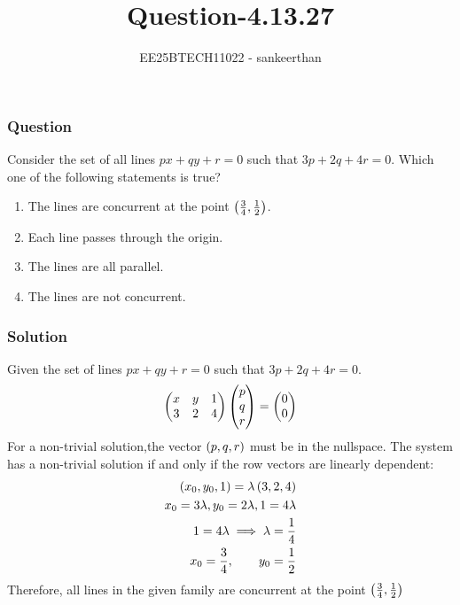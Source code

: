 \documentclass{beamer}
\title{Question-4.13.27}
\author{EE25BTECH11022 - sankeerthan}
\date{}
\begin{document}
\frame{\titlepage}

\begin{frame}
\frametitle{Question}
Consider the set of all lines $px + qy + r = 0$ such that $3p + 2q + 4r = 0$.
Which one of the following statements is true?
\begin{enumerate}
  \item The lines are concurrent at the point $\left(\frac{3}{4},\frac{1}{2}\right)$.
  \item Each line passes through the origin.
  \item The lines are all parallel.
  \item The lines are not concurrent.
\end{enumerate}
\end{frame}

\begin{frame}
\frametitle{Solution}
Given the set of lines $px + qy + r = 0$ such that $3p + 2q + 4r = 0$.
\begin{align}
\begin{pmatrix}x & y & 1 \\3 & 2 & 4\end{pmatrix}\begin{pmatrix}p \\ q \\ r\end{pmatrix}=\begin{pmatrix}0 \\ 0\end{pmatrix}
\end{align}
For a non-trivial solution,the vector $\left(p, q, r\right)$ must be in the nullspace. The system has a non-trivial solution if and only if the row vectors are linearly dependent:
\begin{align} 
\left(x_0, y_0, 1\right) = \lambda\left(3, 2, 4\right) \\
x_0 = 3\lambda,y_0 = 2\lambda,1 = 4\lambda  \\
1 = 4\lambda \implies \lambda = \frac{1}{4} \\
x_0 = \frac{3}{4},\qquad y_0 = \frac{1}{2} 
\end{align}
Therefore, all lines in the given family are concurrent at the point
$\left(\frac{3}{4},\frac{1}{2}\right)$
\end{frame}
\end{document}
